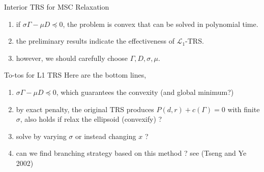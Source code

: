 \documentclass{beamerswitch}
\begin{document}
\begin{frame}[allowframebreaks]{Interior TRS for MSC Relaxation}
  \begin{enumerate}
    \item if \(\sigma \Gamma - \mu D \preceq 0\), the problem is convex that can be solved in polynomial time.
    \item the preliminary results indicate the effectiveness of \(\mathcal L_1\)-TRS.
    \item however, we should carefully choose \(\Gamma, D, \sigma, \mu\).
  \end{enumerate}
\end{frame}

\begin{frame}[allowframebreaks]{To-tos for L1 TRS}
  Here are the bottom lines,

  \begin{enumerate}
    \item \(\sigma \Gamma - \mu D \preceq 0\), which guarantees the convexity (and global minimum?)
    \item by exact penalty, the original TRS produces \(P(d, r) + c(\Gamma) = 0\) with finite \(\sigma\), also holds if relax the ellipsoid (convexify) ?
    \item solve by varying \(\sigma\) or instead changing \(x\) ?
    \item can we find branching strategy based on this method ? see (Tseng and Ye 2002)
  \end{enumerate}
\end{frame}
\end{document}
